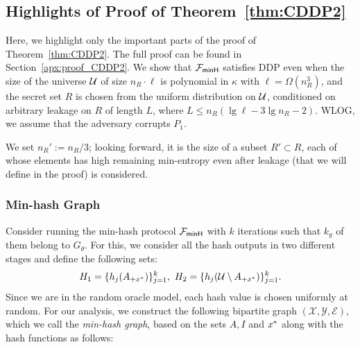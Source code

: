 \subsection{Highlights of Proof of Theorem~\ref{thm:CDDP2}} \label{sec:ddp-polysize}
Here, we highlight only the important parts of the proof of
Theorem~\ref{thm:CDDP2}. The full proof can be found in
Section~\ref{apx:proof_CDDP2}. 
%
We show that ${\mathcal{F}_\mathsf{minH}}$ satisfies DDP even when the size of
the universe $\mathcal{U}$ of size $n_R \cdot \ell$ is polynomial in $\kappa$
with $\ell = \Omega(n_R^3)$, and the secret set $R$ is chosen from the
uniform distribution on $\mathcal{U}$, conditioned on arbitrary leakage on $R$ of
length $L$, where $L \le n_R (\lg \ell - 3 \lg n_R - 2)$.  WLOG, we assume
that the adversary corrupts $P_1$. 

We set $n_R' := n_R/3$; looking forward, it is the size of
a subset $R' \subset R$, each of whose elements has high remaining
min-entropy even after leakage (that we will define in the proof) is
considered.

\subsubsection{Min-hash Graph}
Consider running the min-hash protocol ${\mathcal{F}_\mathsf{minH}}$ with $k$ iterations such
that $k_g$ of them belong to $G_\theta$. For this, we consider all the hash outputs in two different stages and define the following sets:
%
\[ H_1 = \{ h_j(A_{+{x^*}})\}_{j=1}^k, 
  ~ H_2 = \{h_j(\mathcal{U} \setminus A_{+x^*})\}_{j=1}^k. \] 
%
 Since we are
in the random oracle model, each hash value is chosen uniformly at
random.  For our analysis, we construct the following bipartite graph
$(\mathcal{X},\mathcal{Y},\mathcal{E})$, which we call the {\em min-hash
graph}, based on the sets $A, I$ and ${x^*}$ along with
the hash functions as follows:


